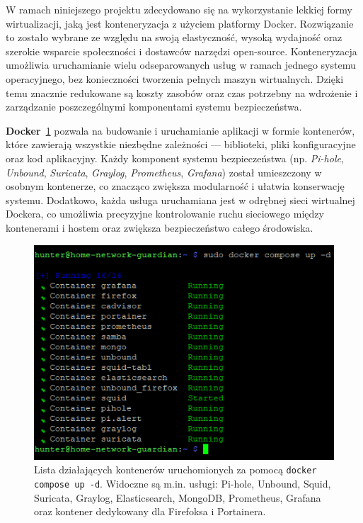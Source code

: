 \documentclass[
    left=2.5cm,         %
    right=2.5cm,        %
    top=2.5cm,          %
    bottom=3cm,         %
    bindingoffset=6mm,  %
    nohyphenation=true %
]{eiti/eiti-thesis} %
\begin{document}
W ramach niniejszego projektu zdecydowano się na wykorzystanie lekkiej formy wirtualizacji, jaką jest konteneryzacja z użyciem platformy Docker\cite{docker-wiki}. Rozwiązanie to zostało wybrane ze względu na swoją elastyczność, wysoką wydajność oraz szerokie wsparcie społeczności i dostawców narzędzi open-source. Konteneryzacja umożliwia uruchamianie wielu odseparowanych usług w ramach jednego systemu operacyjnego, bez konieczności tworzenia pełnych maszyn wirtualnych. Dzięki temu znacznie redukowane są koszty zasobów oraz czas potrzebny na wdrożenie i zarządzanie poszczególnymi komponentami systemu bezpieczeństwa.

\textbf{Docker}~\ref{fig:hunter-docker} pozwala na budowanie i uruchamianie aplikacji w formie kontenerów, które zawierają wszystkie niezbędne zależności — biblioteki, pliki konfiguracyjne oraz kod aplikacyjny. Każdy komponent systemu bezpieczeństwa (np. \textit{Pi-hole}, \textit{Unbound}, \textit{Suricata}, \textit{Graylog}, \textit{Prometheus}, \textit{Grafana}) został umieszczony w osobnym kontenerze, co znacząco zwiększa modularność i ułatwia konserwację systemu. Dodatkowo, każda usługa uruchamiana jest w odrębnej sieci wirtualnej Dockera, co umożliwia precyzyjne kontrolowanie ruchu sieciowego między kontenerami i hostem oraz zwiększa bezpieczeństwo całego środowiska.
\begin{figure}[H]
    \centering
    \includegraphics[width=\textwidth]{img/docker.png}
    \caption{Lista działających kontenerów uruchomionych za pomocą \texttt{docker compose up -d}. Widoczne są m.in. usługi: Pi-hole, Unbound, Squid, Suricata, Graylog, Elasticsearch, MongoDB, Prometheus, Grafana oraz kontener dedykowany dla Firefoksa i Portainera.}
    \label{fig:hunter-docker}
\end{figure}
\end{document}
